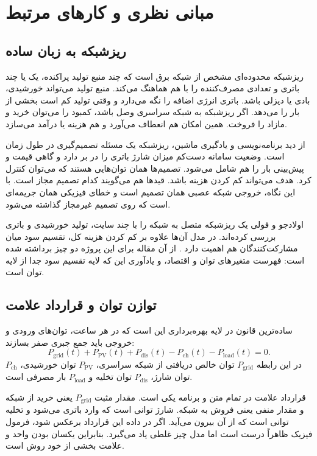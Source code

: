 \chapter{مبانی نظری و کارهای مرتبط}
\label{chap:background}

\section{ریزشبکه به زبان ساده}
ریزشبکه محدوده‌ای مشخص از شبکه برق است که چند منبع تولید پراکنده، یک یا چند باتری و تعدادی مصرف‌کننده را با هم هماهنگ می‌کند. منبع تولید می‌تواند خورشیدی، بادی یا دیزلی باشد. باتری انرژی اضافه را نگه می‌دارد و وقتی تولید کم است بخشی از بار را می‌دهد. اگر ریزشبکه به شبکه سراسری وصل باشد، کمبود را می‌توان خرید و مازاد را فروخت. همین امکان هم انعطاف می‌آورد و هم هزینه یا درآمد می‌سازد.

از دید برنامه‌نویسی و یادگیری ماشین، ریزشبکه یک مسئله تصمیم‌گیری در طول زمان است. وضعیت سامانه دست‌کم میزان شارژ باتری را در بر دارد و گاهی قیمت و پیش‌بینی بار را هم شامل می‌شود. تصمیم‌ها همان توان‌هایی هستند که می‌توان کنترل کرد. هدف می‌تواند کم کردن هزینه باشد. قیدها هم می‌گویند کدام تصمیم مجاز است. با این نگاه، خروجی شبکه عصبی همان تصمیم است و خطای فیزیکی همان جریمه‌ای است که روی تصمیم غیرمجاز گذاشته می‌شود.

اولادجو و فولی یک ریزشبکه متصل به شبکه را با چند سایت، تولید خورشیدی و باتری بررسی کرده‌اند. در مدل آن‌ها علاوه بر کم کردن هزینه کل، تقسیم سود میان مشارکت‌کنندگان هم اهمیت دارد . از آن مقاله برای این پروژه دو چیز برداشته شده است: فهرست متغیرهای توان و اقتصاد، و یادآوری این که لایه تقسیم سود جدا از لایه توان است.

\section{توازن توان و قرارداد علامت}
ساده‌ترین قانون در لایه بهره‌برداری این است که در هر ساعت، توان‌های ورودی و خروجی باید جمع جبری صفر بسازند:
\begin{equation}
  P_{\mathrm{grid}}(t)+P_{\mathrm{PV}}(t)+P_{\mathrm{dis}}(t)
  -P_{\mathrm{ch}}(t)-P_{\mathrm{load}}(t)=0.
  \label{eq:power-balance}
\end{equation}
در این رابطه $P_{\mathrm{grid}}$ توان خالص دریافتی از شبکه سراسری، $P_{\mathrm{PV}}$ توان خورشیدی، $P_{\mathrm{ch}}$ توان شارژ، $P_{\mathrm{dis}}$ توان تخلیه و $P_{\mathrm{load}}$ بار مصرفی است.

قرارداد علامت در تمام متن و برنامه یکی است. مقدار مثبت $P_{\mathrm{grid}}$ یعنی خرید از شبکه و مقدار منفی یعنی فروش به شبکه. شارژ توانی است که وارد باتری می‌شود و تخلیه توانی است که از آن بیرون می‌آید. اگر در داده این قرارداد برعکس شود، فرمول فیزیک ظاهراً درست است اما مدل چیز غلطی یاد می‌گیرد. بنابراین یکسان بودن واحد و علامت بخشی از خود روش است.

